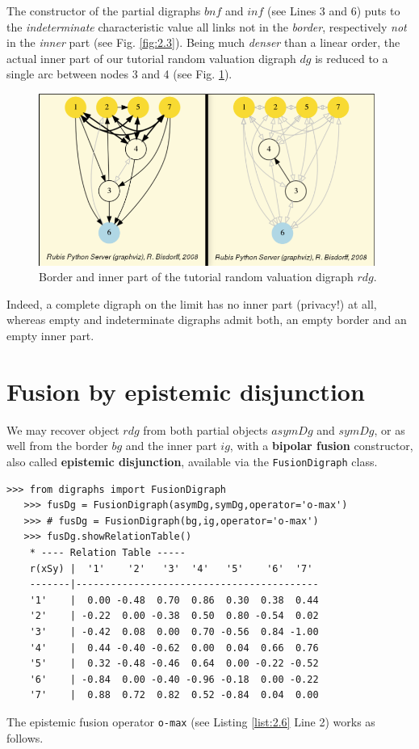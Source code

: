 The constructor of the partial digraphs $bnf$ and $inf$  (see Lines 3 and 6) puts to the \emph{indeterminate} characteristic value all links not in the \emph{border}, respectively \emph{not} in the \emph{inner} part (see Fig. \ref{fig:2.3}). Being much {\em denser\/} than a linear order, the actual inner part of our tutorial random valuation digraph $dg$ is reduced to a single arc between nodes 3 and 4 (see Fig. \ref{fig:2.4}).
\begin{figure}[h]
\includegraphics[width=11cm]{Figures/graphBorderAndInner.png}
\caption{Border and inner part of the tutorial random valuation digraph $rdg$.}
\label{fig:2.4}       %
\end{figure}
Indeed, a complete digraph on the limit has no inner part (privacy!) at all, whereas empty and indeterminate digraphs admit both, an empty border and an empty inner part.

\section{Fusion by epistemic disjunction}
\label{sec:2.5}

We may recover object $rdg$ from both partial objects $asymDg$ and $symDg$, or as well from the border $bg$ and the inner part $ig$, with a \textbf{bipolar fusion} constructor, also called \textbf{epistemic disjunction}, available via the \texttt{FusionDigraph} class. 
\begin{lstlisting}[caption={Epistemic fusion of partial diagraphs},label=list:2.6]
   >>> from digraphs import FusionDigraph
   >>> fusDg = FusionDigraph(asymDg,symDg,operator='o-max')
   >>> # fusDg = FusionDigraph(bg,ig,operator='o-max')
   >>> fusDg.showRelationTable()
    * ---- Relation Table -----
    r(xSy) |  '1'    '2'   '3'  '4'   '5'    '6'  '7'	  
    -------|------------------------------------------
    '1'    |  0.00 -0.48  0.70  0.86  0.30  0.38  0.44	 
    '2'    | -0.22  0.00 -0.38  0.50  0.80 -0.54  0.02	 
    '3'    | -0.42  0.08  0.00  0.70 -0.56  0.84 -1.00	 
    '4'    |  0.44 -0.40 -0.62  0.00  0.04  0.66  0.76	 
    '5'    |  0.32 -0.48 -0.46  0.64  0.00 -0.22 -0.52	 
    '6'    | -0.84  0.00 -0.40 -0.96 -0.18  0.00 -0.22	 
    '7'    |  0.88  0.72  0.82  0.52 -0.84  0.04  0.00
\end{lstlisting}
The epistemic fusion operator \texttt{o-max} (see Listing \ref{list:2.6} Line 2) works as follows.

